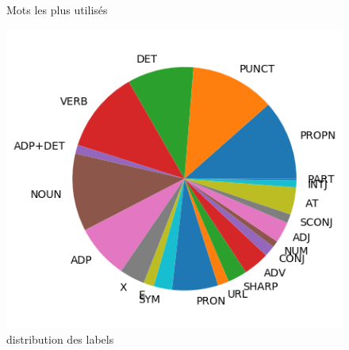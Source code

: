 \begin{figure}[H]
\begin{minipage}{0.48\textwidth}
\begin{tabular}{|l || *{11 }{|c} |}
\end{tabular}
\caption{ Mots les plus utilisés } \label{Fig:muw}\end{minipage} 
\begin{minipage}{0.48\textwidth} \centering
\label{Fig:foottest_img.png}
\caption{distribution des labels}\includegraphics[width=.7\linewidth]{foottest_img.png}

\end{minipage}
\end{figure}


